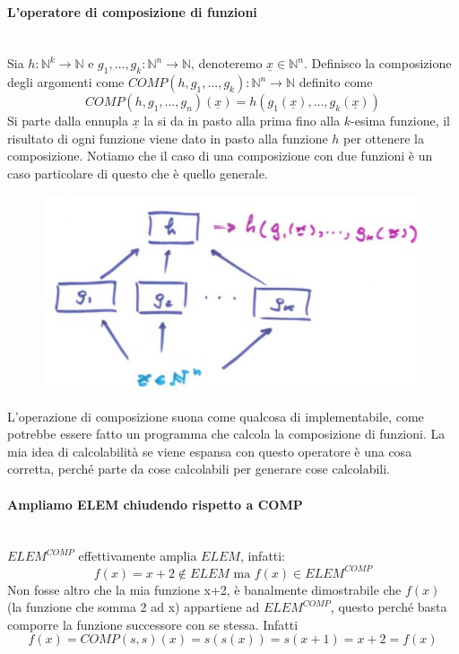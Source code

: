 \documentclass{article}
\begin{document}
\paragraph{L'operatore di composizione di funzioni}\mbox{}\\
Sia $h:\mathbb{N}^k\rightarrow\mathbb{N}$ e $g_1,\dots,g_k:\mathbb{N}^n\rightarrow\mathbb{N}$,
denoteremo $\underline{x}\in\mathbb{N}^n$.
Definisco la composizione degli argomenti come $COMP(h,g_1,\dots,g_k):\mathbb{N}^n\rightarrow\mathbb{N}$
definito come
$$COMP(h,g_1,\dots,g_n)(\underline{x})=h(g_1(\underline{x}),\dots,g_k(\underline{x}))$$
Si parte dalla ennupla $\underline{x}$ la si da in pasto alla prima fino alla $k$-esima funzione,
il risultato di ogni funzione viene dato in pasto alla funzione $h$ per ottenere la composizione.
Notiamo che il caso di una composizione con due funzioni è un caso particolare di questo che è
quello generale.
\begin{figure}[H]
    \centering
    \includegraphics[scale=0.5]{images/composizione_ooperazine.png}
\end{figure}
L'operazione di composizione suona come qualcosa di implementabile, come potrebbe essere
fatto un programma che calcola la composizione di funzioni. La mia idea di calcolabilità
se viene espansa con questo operatore è una cosa corretta, perché parte da cose calcolabili
per generare cose calcolabili.
\paragraph{Ampliamo ELEM chiudendo rispetto a COMP}\mbox{}\\
$ELEM^{COMP}$ effettivamente amplia $ELEM$, infatti:
$$f(x)=x+2\notin ELEM\text{ ma }f(x)\in ELEM^{COMP}$$
Non fosse altro che la mia funzione x+2, è banalmente dimostrabile che $f(x)$ (la funzione
che somma 2 ad x) appartiene ad $ELEM^{COMP}$, questo perché basta
comporre la funzione successore con se stessa. Infatti $$f(x)=COMP(s,s)(x)=s(s(x))=s(x+1)=x+2=f(x)$$
\end{document}
